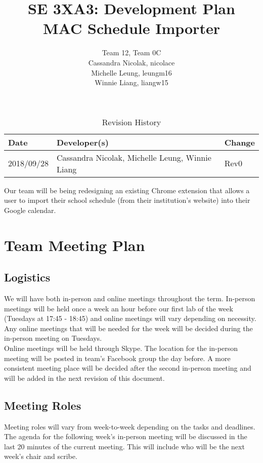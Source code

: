 \documentclass{article}
\title{SE 3XA3: Development Plan\\MAC Schedule Importer}
\author{Team 12, Team 0C
		\\ Cassandra Nicolak, nicolace
		\\ Michelle Leung, leungm16
		\\ Winnie Liang, liangw15
}
\date{}
\begin{document}
\begin{table}[hp]
\caption{Revision History} \label{TblRevisionHistory}
\begin{tabularx}{\textwidth}{llX}
\toprule
\textbf{Date} & \textbf{Developer(s)} & \textbf{Change}\\
\midrule
2018/09/28 & Cassandra Nicolak, Michelle Leung, Winnie Liang & Rev0\\
\bottomrule
\end{tabularx}
\end{table}

\newpage

\maketitle

Our team will be being redesigning an existing Chrome extension that allows a user to import their school schedule (from their institution's website) into their Google calendar.


\section{Team Meeting Plan}
\subsection{Logistics}
\hspace{5mm}We will have both in-person and online meetings throughout the term. In-person meetings will be held once a week an hour before our first lab of the week (Tuesdays at 17:45 - 18:45) and online meetings will vary depending on necessity. Any online meetings that will be needed for the week will be decided during the in-person meeting on Tuesdays. \\

Online meetings will be held through Skype. The location for the in-person meeting will be posted in team's Facebook group the day before. A more consistent meeting place will be decided after the second in-person meeting and will be added in the next revision of this document.

\subsection{Meeting Roles}
\hspace{5mm}Meeting roles will vary from week-to-week depending on the tasks and deadlines. The agenda for the following week's in-person meeting will be discussed in the last 20 minutes of the current meeting. This will include who will be the next week's chair and scribe.\\
\end{document}
